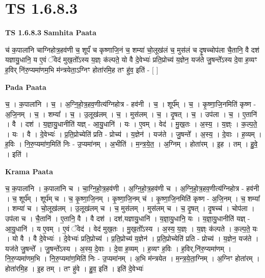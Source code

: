 \documentclass[17pt]{extarticle}
\begin{document}
\section{ TS 1.6.8.3 }

\textbf{TS 1.6.8.3 } \newline
\textbf{Samhita Paata} \newline

च॑ क॒पाला॑नि चाग्निहोत्र॒हव॑णी च॒ शूर्पं॑ च कृष्णाजि॒नं च॒ शम्या॑ चो॒लूख॑लं च॒ मुस॑लं च दृ॒षच्चोप॑ला चै॒तानि॒ वै दश॑ यज्ञायु॒धानि॒ य ए॒वं ॅवेद॑ मुख॒तो᳚ऽस्य य॒ज्ञ्ः क॑ल्पते॒ यो वै दे॒वेभ्यः॑ प्रति॒प्रोच्य॑ य॒ज्ञेन॒ यज॑ते जु॒षन्ते᳚ऽस्य दे॒वा ह॒व्यꣳ ह॒विर् नि॑रु॒प्यमा॑णम॒भि म॑न्त्रयेता॒ऽग्निꣳ होता॑रमि॒ह तꣳ हु॑व॒ इति॑ - [ ] \newline

\textbf{Pada Paata} \newline

च॒ । क॒पाला॑नि । च॒ । अ॒ग्नि॒हो॒त्र॒हव॒णीत्य॑ग्निहोत्र - हव॑नी । च॒ । शूर्प᳚म् । च॒ । कृ॒ष्णा॒जि॒नमिति॑ कृष्ण - अ॒जि॒नम् । च॒ । शम्या᳚ । च॒ । उ॒लूख॑लम् । च॒ । मुस॑लम् । च॒ । दृ॒षत् । च॒ । उप॑ला । च॒ । ए॒तानि॑ । वै । दश॑ । य॒ज्ञा॒यु॒धानीति॑ यज्ञ् - आ॒यु॒धानि॑ । यः । ए॒वम् । वेद॑ । मु॒ख॒तः । अ॒स्य॒ । य॒ज्ञ्ः । क॒ल्प॒ते॒ । यः । वै । दे॒वेभ्यः॑ । प्र॒ति॒प्रोच्येति॑ प्रति - प्रोच्य॑ । य॒ज्ञेन॑ । यज॑ते । जु॒षन्ते᳚ । अ॒स्य॒ । दे॒वाः । ह॒व्यम् । ह॒विः । नि॒रु॒प्यमा॑ण॒मिति॑ निः - उ॒प्यमा॑नम् । अ॒भीति॑ । म॒न्त्र॒ये॒त॒ । अ॒ग्निम् । होता॑रम् । इ॒ह । तम् । हु॒वे॒ । इति॑ ।  \newline


\textbf{Krama Paata} \newline

च॒ क॒पाला॑नि । क॒पाला॑नि च । चा॒ग्नि॒हो॒त्र॒हव॑णी । अ॒ग्नि॒हो॒त्र॒हव॑णी च । अ॒ग्नि॒हो॒त्र॒हव॒णीत्य॑ग्निहोत्र - हव॑नी । च॒ शूर्प᳚म् । शूर्प॑म् च । च॒ कृ॒ष्णा॒जि॒नम् । कृ॒ष्णा॒जि॒नम् च॑ । कृ॒ष्णा॒जि॒नमिति॑ कृष्ण - अ॒जि॒नम् । च॒ शम्या᳚ । शम्या॑ च । चो॒लूख॑लम् । उ॒लूख॑लम् च । च॒ मुस॑लम् । मुस॑लम् च । च॒ दृ॒षत् । दृ॒षच्च॑ । चोप॑ला । उप॑ला च । चै॒तानि॑ । ए॒तानि॒ वै । वै दश॑ । दश॑,यज्ञायु॒धानि॑ । य॒ज्ञा॒यु॒धानि॒ यः । य॒ज्ञा॒यु॒धानीति॑ यज्ञ् - आ॒यु॒धानि॑ । य ए॒वम् । ए॒वं ॅवेद॑ । वेद॑ मुख॒तः । मु॒ख॒तो᳚ऽस्य । अ॒स्य॒ य॒ज्ञ्ः । य॒ज्ञ्ः क॑ल्पते । क॒ल्प॒ते॒ यः । यो वै । वै दे॒वेभ्यः॑ । दे॒वेभ्यः॑ प्रति॒प्रोच्य॑ । प्र॒ति॒प्रोच्य॑ य॒ज्ञेन॑ । प्र॒ति॒प्रोच्येति॑ प्रति - प्रोच्य॑ । य॒ज्ञेन॒ यज॑ते । यज॑ते जु॒षन्ते᳚ । जु॒षन्ते᳚ऽस्य । अ॒स्य॒ दे॒वाः । दे॒वा ह॒व्यम् । ह॒व्यꣳ ह॒विः । ह॒विर्,नि॑रु॒प्यमा॑णम् । नि॒रु॒प्यमा॑णम॒भि । नि॒रु॒प्यमा॑ण॒मिति॑ निः - उ॒प्यमा॑नम् । अ॒भि म॑न्त्रयेत । म॒न्त्र॒ये॒ता॒ग्निम् । अ॒ग्निꣳ होता॑रम् । होता॑रमि॒ह । इ॒ह तम् । तꣳ हु॑वे । हु॒व॒ इति॑ । इति॑ दे॒वेभ्यः॑ \newline
\end{document}
